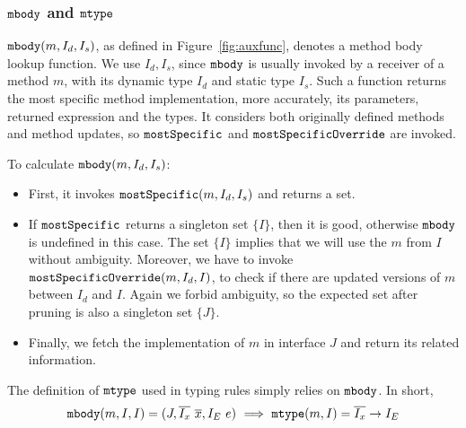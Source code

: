 \subsubsection{$\texttt{mbody}$ and $\texttt{mtype}$}

$\texttt{mbody}(m, I_d, I_s)$, as defined in Figure~\ref{fig:auxfunc}, denotes a method body lookup function.
We use $I_d, I_s$, since $\texttt{mbody}$ is usually invoked by a receiver of a method $m$, with its dynamic
type $I_d$ and static type $I_s$. Such a function returns the most specific method implementation, more
accurately, its parameters, returned expression and the types. It considers both originally defined methods and method updates, so $\texttt{mostSpecific}$ and $\texttt{mostSpecificOverride}$ are invoked.

To calculate $\texttt{mbody}(m, I_d, I_s)$:
\begin{itemize}
	\item First, it invokes $\texttt{mostSpecific}(m, I_d, I_s)$ and returns a set.
	\item If $\texttt{mostSpecific}$ returns a singleton set $\{I\}$, then it is good, otherwise $\texttt{mbody}$ is undefined in
	this case. The set $\{I\}$ implies that we will use the $m$ from $I$ without ambiguity. Moreover, we have to invoke $\texttt{mostSpecificOverride}(m, I_d, I)$, to check if there are updated versions of $m$ between $I_d$ and $I$. Again we forbid ambiguity, so the expected set after pruning is also a singleton set $\{J\}$.
	\item Finally, we fetch the implementation of $m$ in interface $J$ and return its related information.
\end{itemize}
The definition of $\texttt{mtype}$ used in typing rules simply relies on $\texttt{mbody}$. In short,
$$\texttt{mbody}(m, I, I) = (J, \overline{I_x}\ \overline{x}, I_E\ e) \ \Longrightarrow\ \texttt{mtype}(m, I) = \overline{I_x}\rightarrow I_E$$

